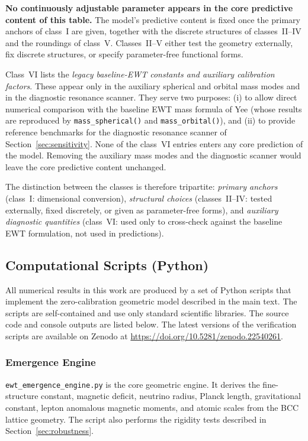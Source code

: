 \documentclass[10pt,a4paper]{article}
\begin{document}
\noindent\textbf{No continuously adjustable parameter appears in the
	core predictive content of this table.} The model's predictive
content is fixed once the primary anchors of class~I
are given, together with the discrete structures of classes~II--IV
and the roundings of class~V. Classes~II--V either test the geometry
externally, fix discrete structures, or specify parameter-free
functional forms.

Class~VI lists the \emph{legacy baseline-EWT constants and auxiliary
	calibration factors}. These appear only in the auxiliary spherical
and orbital mass modes and in the diagnostic resonance scanner. They
serve two purposes: (i) to allow direct numerical comparison with the
baseline EWT mass formula of Yee (whose results are reproduced by
\texttt{mass\_spherical()} and \texttt{mass\_orbital()}), and (ii) to
provide reference benchmarks for the diagnostic resonance scanner of
Section~\ref{sec:sensitivity}. None of the class~VI entries enters
any core prediction of the model. Removing the auxiliary mass modes
and the diagnostic scanner would leave the core predictive content
unchanged.

The distinction between the classes is therefore tripartite:
\emph{primary anchors} (class~I: dimensional conversion),
\emph{structural choices} (classes~II--IV: tested externally, fixed
discretely, or given as parameter-free forms), and \emph{auxiliary
	diagnostic quantities} (class~VI: used only to cross-check against
the baseline EWT formulation, not used in predictions).

\subsection{Computational Scripts (Python)}
\label{app:python_scripts}

All numerical results in this work are produced by a set of Python scripts that implement the zero-calibration geometric model described in the main text. The scripts are self-contained and use only standard scientific libraries. The source code and console outputs are listed below. The latest versions of the verification scripts are available on Zenodo at \url{https://doi.org/10.5281/zenodo.22540261}.

\subsubsection{Emergence Engine}
\label{app:ewt_emergence_engine}

\texttt{ewt\_emergence\_engine.py} is the core geometric engine. It derives the fine-structure constant, magnetic deficit, neutrino radius, Planck length, gravitational constant, lepton anomalous magnetic moments, and atomic scales from the BCC lattice geometry. The script also performs the rigidity tests described in Section~\ref{sec:robustness}.
\end{document}
